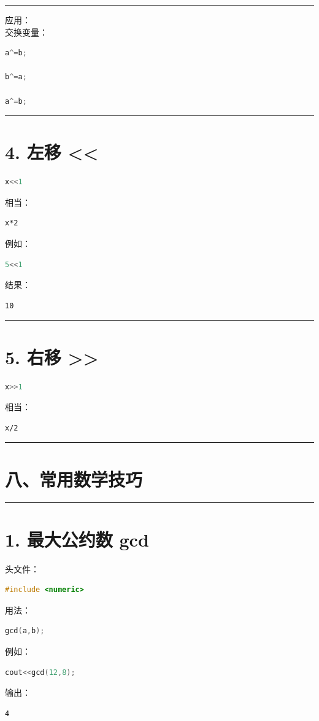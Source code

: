 \documentclass[9pt,twocolumn]{extarticle}
\begin{document}
\noindent\rule{\linewidth}{0.4pt}

应用：\\
交换变量：
\begin{lstlisting}[language=C++]
a^=b;

b^=a;

a^=b;
\end{lstlisting}

\noindent\rule{\linewidth}{0.4pt}

\section{4. 左移 <<}
\begin{lstlisting}[language=C++]
x<<1
\end{lstlisting}
相当：
\begin{lstlisting}
x*2
\end{lstlisting}
例如：
\begin{lstlisting}[language=C++]
5<<1
\end{lstlisting}
结果：
\begin{lstlisting}
10
\end{lstlisting}

\noindent\rule{\linewidth}{0.4pt}

\section{5. 右移 >>}
\begin{lstlisting}[language=C++]
x>>1
\end{lstlisting}
相当：
\begin{lstlisting}
x/2
\end{lstlisting}

\noindent\rule{\linewidth}{0.4pt}

\section{八、常用数学技巧}

\noindent\rule{\linewidth}{0.4pt}

\section{1. 最大公约数 gcd}

头文件：
\begin{lstlisting}[language=C++]
#include <numeric>
\end{lstlisting}
用法：
\begin{lstlisting}[language=C++]
gcd(a,b);
\end{lstlisting}
例如：
\begin{lstlisting}[language=C++]
cout<<gcd(12,8);
\end{lstlisting}
输出：
\begin{lstlisting}
4
\end{lstlisting}
\end{document}
